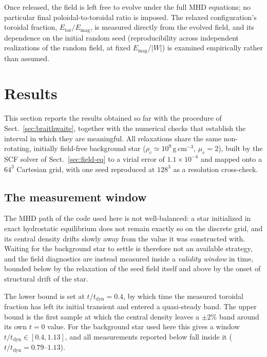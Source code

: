 \documentclass{aa}
\begin{document}
Once released, the field is left free to evolve under the full MHD
equations; no particular final poloidal-to-toroidal ratio is imposed.
The relaxed configuration's toroidal fraction,
$E_{\mathrm{tor}}/E_{\mathrm{mag}}$, is measured directly from the
evolved field, and its dependence on the initial random seed
(reproducibility across independent realizations of the random field,
at fixed $E_{\mathrm{mag}}/|W|$) is examined empirically rather than
assumed.


\section{Results}
\label{sec:results}

This section reports the results obtained so far with the procedure of
Sect.~\ref{sec:braithwaite}, together with the numerical checks that
establish the interval in which they are meaningful. All relaxations
share the same non-rotating, initially field-free background star
($\rho_c \simeq 10^9$\,g\,cm$^{-3}$, $\mu_e = 2$), built by the SCF
solver of Sect.~\ref{sec:field-eq} to a virial error of
$1.1\times10^{-4}$ and mapped onto a $64^3$ Cartesian grid, with one
seed reproduced at $128^3$ as a resolution cross-check.

\subsection{The measurement window}
\label{sec:window}

The MHD path of the code used here is not well-balanced: a star
initialized in exact hydrostatic equilibrium does not remain exactly so
on the discrete grid, and its central density drifts slowly away from
the value it was constructed with. Waiting for the background star to
settle is therefore not an available strategy, and the field
diagnostics are instead measured inside a \emph{validity window} in
time, bounded below by the relaxation of the seed field itself and
above by the onset of structural drift of the star.

The lower bound is set at $t/t_{\mathrm{dyn}} = 0.4$, by which time the
measured toroidal fraction has left its initial transient and entered a
quasi-steady band. The upper bound is the first sample at which the
central density leaves a $\pm2\%$ band around its own $t=0$ value. For
the background star used here this gives a window
$t/t_{\mathrm{dyn}} \in [0.4, 1.13]$, and all measurements reported
below fall inside it ($t/t_{\mathrm{dyn}} = 0.79$--$1.13$).
\end{document}
